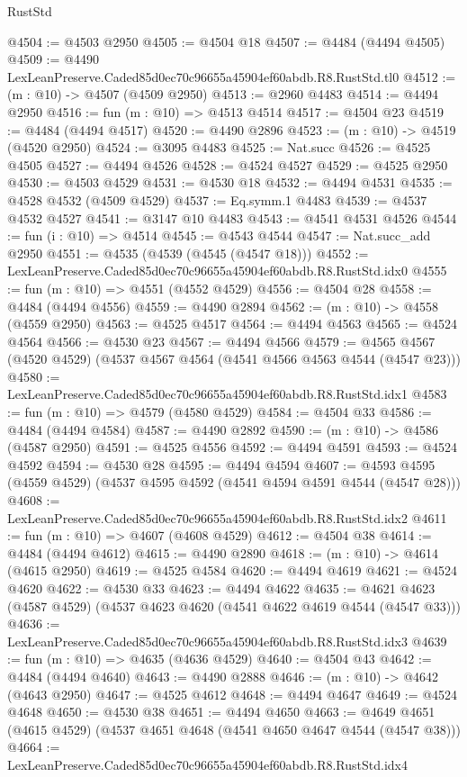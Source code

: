 \begin{lexlean}{RustStd}
\begin{coremodule}
@4504 := @4503 @2950
@4505 := @4504 @18
@4507 := @4484 (@4494 @4505)
@4509 := @4490 LexLeanPreserve.Caded85d0ec70c96655a45904ef60abdb.R8.RustStd.tl0
@4512 := (m : @10) -> @4507 (@4509 @2950)
@4513 := @2960 @4483
@4514 := @4494 @2950
@4516 := fun (m : @10) => @4513 @4514
@4517 := @4504 @23
@4519 := @4484 (@4494 @4517)
@4520 := @4490 @2896
@4523 := (m : @10) -> @4519 (@4520 @2950)
@4524 := @3095 @4483
@4525 := Nat.succ
@4526 := @4525 @4505
@4527 := @4494 @4526
@4528 := @4524 @4527
@4529 := @4525 @2950
@4530 := @4503 @4529
@4531 := @4530 @18
@4532 := @4494 @4531
@4535 := @4528 @4532 (@4509 @4529)
@4537 := Eq.symm.{1} @4483
@4539 := @4537 @4532 @4527
@4541 := @3147 @10 @4483
@4543 := @4541 @4531 @4526
@4544 := fun (i : @10) => @4514
@4545 := @4543 @4544
@4547 := Nat.succ_add @2950
@4551 := @4535 (@4539 (@4545 (@4547 @18)))
@4552 := LexLeanPreserve.Caded85d0ec70c96655a45904ef60abdb.R8.RustStd.idx0
@4555 := fun (m : @10) => @4551 (@4552 @4529)
@4556 := @4504 @28
@4558 := @4484 (@4494 @4556)
@4559 := @4490 @2894
@4562 := (m : @10) -> @4558 (@4559 @2950)
@4563 := @4525 @4517
@4564 := @4494 @4563
@4565 := @4524 @4564
@4566 := @4530 @23
@4567 := @4494 @4566
@4579 := @4565 @4567 (@4520 @4529) (@4537 @4567 @4564 (@4541 @4566 @4563 @4544 (@4547 @23)))
@4580 := LexLeanPreserve.Caded85d0ec70c96655a45904ef60abdb.R8.RustStd.idx1
@4583 := fun (m : @10) => @4579 (@4580 @4529)
@4584 := @4504 @33
@4586 := @4484 (@4494 @4584)
@4587 := @4490 @2892
@4590 := (m : @10) -> @4586 (@4587 @2950)
@4591 := @4525 @4556
@4592 := @4494 @4591
@4593 := @4524 @4592
@4594 := @4530 @28
@4595 := @4494 @4594
@4607 := @4593 @4595 (@4559 @4529) (@4537 @4595 @4592 (@4541 @4594 @4591 @4544 (@4547 @28)))
@4608 := LexLeanPreserve.Caded85d0ec70c96655a45904ef60abdb.R8.RustStd.idx2
@4611 := fun (m : @10) => @4607 (@4608 @4529)
@4612 := @4504 @38
@4614 := @4484 (@4494 @4612)
@4615 := @4490 @2890
@4618 := (m : @10) -> @4614 (@4615 @2950)
@4619 := @4525 @4584
@4620 := @4494 @4619
@4621 := @4524 @4620
@4622 := @4530 @33
@4623 := @4494 @4622
@4635 := @4621 @4623 (@4587 @4529) (@4537 @4623 @4620 (@4541 @4622 @4619 @4544 (@4547 @33)))
@4636 := LexLeanPreserve.Caded85d0ec70c96655a45904ef60abdb.R8.RustStd.idx3
@4639 := fun (m : @10) => @4635 (@4636 @4529)
@4640 := @4504 @43
@4642 := @4484 (@4494 @4640)
@4643 := @4490 @2888
@4646 := (m : @10) -> @4642 (@4643 @2950)
@4647 := @4525 @4612
@4648 := @4494 @4647
@4649 := @4524 @4648
@4650 := @4530 @38
@4651 := @4494 @4650
@4663 := @4649 @4651 (@4615 @4529) (@4537 @4651 @4648 (@4541 @4650 @4647 @4544 (@4547 @38)))
@4664 := LexLeanPreserve.Caded85d0ec70c96655a45904ef60abdb.R8.RustStd.idx4

\end{coremodule}
\end{lexlean}
